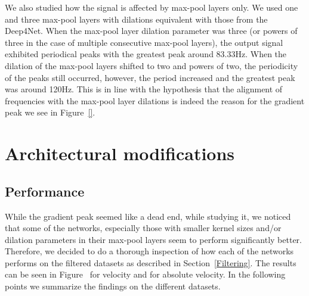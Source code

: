 We also studied how the signal is affected by max-pool layers only.
We used one and three max-pool layers with dilations equivalent with those from the Deep4Net.
When the max-pool layer dilation parameter was three (or powers of three in the case of multiple consecutive max-pool layers), the output signal exhibited periodical peaks with the greatest peak around 83.33Hz.
When the dilation of the max-pool layers shifted to two and powers of two, the periodicity of the peaks still occurred, however, the period increased and the greatest peak was around 120Hz.
This is in line with the hypothesis that the alignment of frequencies with the max-pool layer dilations is indeed the reason for the gradient peak we see in Figure~\ref{}.

\section{Architectural modifications}\label{sec:architectural-modifications}
\subsection{Performance}\label{subsec:performance}
While the gradient peak seemed like a dead end, while studying it, we noticed that some of the networks, especially those with smaller kernel sizes and/or dilation parameters in their max-pool layers seem to perform significantly better.
Therefore, we decided to do a thorough inspection of how each of the networks performs on the filtered datasets as described in Section~\ref{Filtering}.
The results can be seen in Figure~\cite{Figure} for velocity and \cite{Figure} for absolute velocity.
In the following points we summarize the findings on the different datasets.

